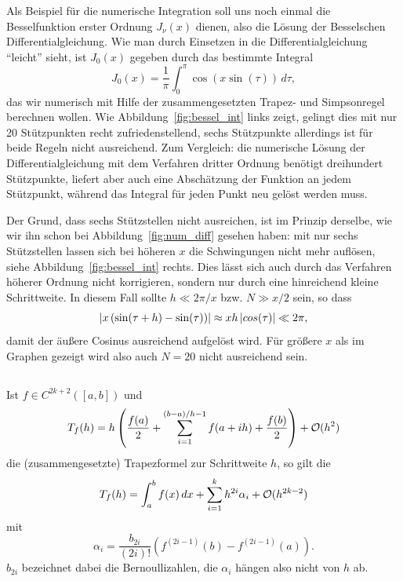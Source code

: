 Als Beispiel für die numerische Integration soll uns noch einmal die
Besselfunktion erster Ordnung $J_\nu(x)$ dienen, also die Lösung der
Besselschen Differentialgleichung. Wie man durch Einsetzen in die
Differentialgleichung "`leicht"' sieht, ist $J_0(x)$ gegeben durch das
bestimmte Integral
\begin{equation}
  \label{eq:besselint}
  J_0(x) = \frac{1}{\pi} \int_0^\pi  \cos(x\sin(\tau))\,d\tau,
\end{equation}
das wir numerisch mit Hilfe der zusammengesetzten Trapez- und
Simpsonregel berechnen wollen. Wie Abbildung~\ref{fig:bessel_int}
links zeigt, gelingt dies mit nur 20 Stützpunkten recht
zufriedenstellend, sechs Stützpunkte allerdings ist für beide Regeln
nicht ausreichend. Zum Vergleich: die numerische Lösung der
Differentialgleichung mit dem Verfahren dritter Ordnung benötigt
dreihundert Stützpunkte, liefert aber auch eine Abschätzung der
Funktion an jedem Stützpunkt, während das Integral für jeden Punkt neu
gelöst werden muss.

Der Grund, dass sechs Stützstellen nicht ausreichen, ist im Prinzip
derselbe, wie wir ihn schon bei Abbildung~\ref{fig:num_diff} gesehen
haben: mit nur sechs Stützstellen lassen sich bei höheren $x$ die
Schwingungen nicht mehr auflösen, siehe Abbildung~\ref{fig:bessel_int}
rechts. Dies lässt sich auch durch das Verfahren höherer Ordnung nicht
korrigieren, sondern nur durch eine hinreichend kleine
Schrittweite. In diesem Fall sollte $h \ll 2\pi/x$ bzw. $N \gg x/2$
sein, so dass
\begin{equation}
  \left\lvert{x\left(\sin(\tau + h) - \sin(\tau)\right)}\right\rvert \approx x h
  \left\lvert{cos(\tau)}\right\rvert \ll 2\pi,
\end{equation}
damit der äußere Cosinus ausreichend aufgelöst wird.  Für größere $x$
als im Graphen gezeigt wird also auch $N=20$ nicht ausreichend sein.

\subsection{}

Ist $f\in C^{2k+2}([a,b])$ und
\begin{equation}
  T_f(h) = h\left(\frac{f(a)}{2} + \sum_{i=1}^{(b-a)/h - 1} f(a + i h) +
    \frac{f(b)}{2}\right) + \mathcal O(h^2)
\end{equation}
die (zusammengesetzte) Trapezformel zur Schrittweite $h$, so gilt die
\emph{}
\begin{equation}
  T_f(h) = \int_a^b f(x)\,dx + \sum_{i=1}^k h^{2i}\alpha_i + \mathcal O(h^{2k-2})
\end{equation}
mit
\begin{equation}
  \alpha_i = \frac{b_{2i}}{(2i)!}\left(f^{(2i-1)}(b) - f^{(2i-1)}(a)\right).
\end{equation}
$b_{2i}$ bezeichnet dabei die Bernoullizahlen, die $\alpha_i$ hängen also
nicht von $h$ ab. 

